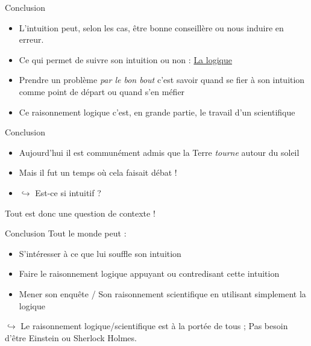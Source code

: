 \documentclass[usenames, dvipsnames]{beamer}
\begin{document}
\begin{frame}[plain]{Conclusion}
\begin{itemize}
\item L'intuition peut, selon les cas, être bonne conseillère ou nous induire en erreur. \pause
\item Ce qui permet de suivre son intuition ou non : \underline{La logique} \pause 
\item Prendre un problème \textit{par le bon bout} c'est savoir quand se fier à son intuition comme point de départ ou quand s'en méfier \pause 
\item Ce raisonnement logique c'est, en grande partie, le travail d'un scientifique
\end{itemize}



\end{frame}




\begin{frame}[plain]{Conclusion}

\begin{itemize}
\item Aujourd'hui il est communément admis que la Terre \textit{tourne} autour du soleil \pause
\item Mais il fut un temps où cela faisait débat ! \pause
\item $\hookrightarrow$ Est-ce si intuitif ? \pause 
\end{itemize}


\vspace{2cm} Tout est donc une question de contexte ! 
\end{frame}



\begin{frame}[plain]{Conclusion}
Tout le monde peut : 
\begin{itemize}
\item S'intéresser à ce que lui souffle son intuition \pause
\item Faire le raisonnement logique appuyant ou contredisant cette intuition \pause 
\item Mener son enquête / Son raisonnement scientifique en utilisant simplement la logique
\end{itemize}
\pause $\hookrightarrow$ Le raisonnement logique/scientifique est à la portée de tous ; Pas besoin d'être Einstein ou Sherlock Holmes.
\end{frame} 
\end{document}
